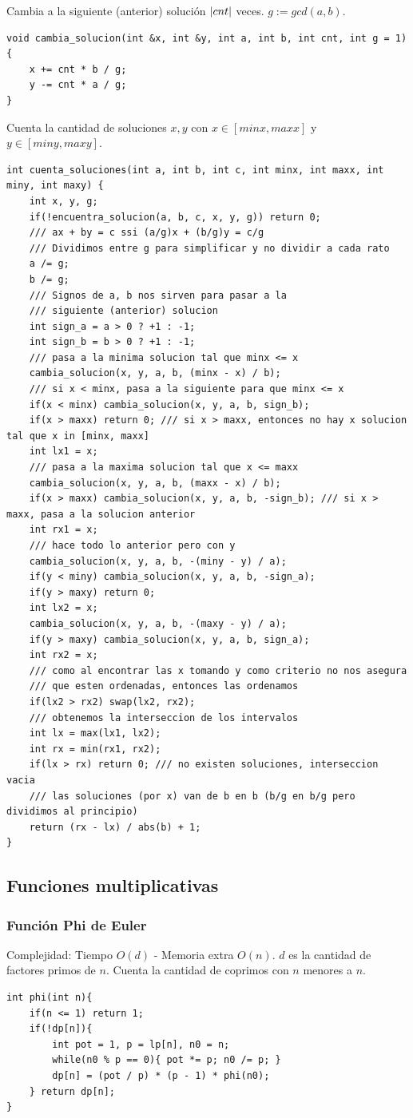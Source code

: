 \documentclass[12 pts,spanish,mexico]{article}
\numberwithin{equation}{section}
\begin{document}
\begin{multicols}{2}
Cambia a la siguiente (anterior) solución $\abs{cnt}$ veces. $g := gcd(a ,b)$.
\begin{verbatim}
void cambia_solucion(int &x, int &y, int a, int b, int cnt, int g = 1) {
    x += cnt * b / g;
    y -= cnt * a / g;
}
\end{verbatim}

Cuenta la cantidad de soluciones $x, y$ con $x \in [minx, maxx]$ y $y \in [miny, maxy]$.
\begin{verbatim}
int cuenta_soluciones(int a, int b, int c, int minx, int maxx, int miny, int maxy) {
    int x, y, g;
    if(!encuentra_solucion(a, b, c, x, y, g)) return 0;
    /// ax + by = c ssi (a/g)x + (b/g)y = c/g
    /// Dividimos entre g para simplificar y no dividir a cada rato
    a /= g;
    b /= g;
    /// Signos de a, b nos sirven para pasar a la
    /// siguiente (anterior) solucion
    int sign_a = a > 0 ? +1 : -1;
    int sign_b = b > 0 ? +1 : -1;
    /// pasa a la minima solucion tal que minx <= x
    cambia_solucion(x, y, a, b, (minx - x) / b);
    /// si x < minx, pasa a la siguiente para que minx <= x
    if(x < minx) cambia_solucion(x, y, a, b, sign_b);
    if(x > maxx) return 0; /// si x > maxx, entonces no hay x solucion tal que x in [minx, maxx]
    int lx1 = x;
    /// pasa a la maxima solucion tal que x <= maxx
    cambia_solucion(x, y, a, b, (maxx - x) / b);
    if(x > maxx) cambia_solucion(x, y, a, b, -sign_b); /// si x > maxx, pasa a la solucion anterior
    int rx1 = x;
    /// hace todo lo anterior pero con y
    cambia_solucion(x, y, a, b, -(miny - y) / a);
    if(y < miny) cambia_solucion(x, y, a, b, -sign_a);
    if(y > maxy) return 0;
    int lx2 = x;
    cambia_solucion(x, y, a, b, -(maxy - y) / a);
    if(y > maxy) cambia_solucion(x, y, a, b, sign_a);
    int rx2 = x;
    /// como al encontrar las x tomando y como criterio no nos asegura
    /// que esten ordenadas, entonces las ordenamos
    if(lx2 > rx2) swap(lx2, rx2);
    /// obtenemos la interseccion de los intervalos
    int lx = max(lx1, lx2);
    int rx = min(rx1, rx2);
    if(lx > rx) return 0; /// no existen soluciones, interseccion vacia
    /// las soluciones (por x) van de b en b (b/g en b/g pero dividimos al principio)
    return (rx - lx) / abs(b) + 1;
}
\end{verbatim}

\subsection{Funciones multiplicativas}
\subsubsection{Función Phi de Euler}
Complejidad: Tiempo $O(d)$ - Memoria extra $O(n)$. $d$ es la cantidad de factores primos de $n$. Cuenta la cantidad de coprimos con $n$ menores a $n$.
\begin{verbatim}
int phi(int n){
    if(n <= 1) return 1;
    if(!dp[n]){
        int pot = 1, p = lp[n], n0 = n;
        while(n0 % p == 0){ pot *= p; n0 /= p; }
        dp[n] = (pot / p) * (p - 1) * phi(n0);
    } return dp[n];
}
\end{verbatim}


\end{multicols}
\end{document}
